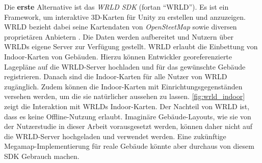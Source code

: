 Die \textbf{erste} Alternative ist das \emph{WRLD SDK} (fortan \enquote{WRLD}).
Es ist ein Framework, um interaktive 3D-Karten für Unity zu erstellen und anzuzeigen.
WRLD bezieht dabei seine Kartendaten von \emph{OpenSteetMap} sowie diversen proprietären Anbietern \parencite{WRLD2018}.
Die Daten werden aufbereitet und Nutzern über WRLDs eigene Server zur Verfügung gestellt.
WRLD erlaubt die Einbettung von Indoor-Karten von Gebäuden.
Hierzu können Entwickler georeferenzierte Lagepläne auf die WRLD-Server hochladen und für das gewünschte Gebäude registrieren.
Danach sind die Indoor-Karten für alle Nutzer von WRLD zugänglich.
Zudem können die Indoor-Karten mit Einrichtungsgegenständen versehen werden, um die sie natürlicher aussehen zu lassen.
\autoref{fig:wrld_indoor} zeigt die Interaktion mit WRLDs Indoor-Karten.
Der Nachteil von WRLD ist, dass es keine Offline-Nutzung erlaubt.
Imaginäre Gebäude-Layouts, wie sie von der Nutzerstudie in dieser Arbeit vorausgesetzt werden, können daher nicht auf die WRLD-Server hochgeladen und verwendet werden.
Eine zukünftige Megamap-Implementierung für reale Gebäude könnte aber durchaus von diesem SDK Gebrauch machen.
